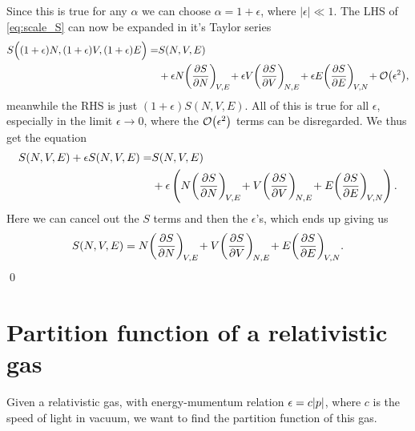 \documentclass[11pt,letter, swedish, english
]{article}
\begin{document}
Since this is true for any $\alpha$ we can choose $\alpha=1+\epsilon$,
where $|\epsilon|\ll1$\footnotemark{}. The LHS of \eqref{eq:scale_S}
can now be expanded in it's Taylor series
\begin{equation}
\begin{aligned}
S\Big((1+\epsilon) N, (1+\epsilon) V, (1+\epsilon) E\Big) =& 
S(N, V, E)\\
&+ \epsilon N\qty(\pdv{S}{N})_{\!V,E}\!
+ \epsilon V\qty(\pdv{S}{V})_{\!N,E}\!
+ \epsilon E\qty(\pdv{S}{E})_{\!V,N}\!
+ \order{\epsilon^2},
\end{aligned}
\end{equation}
meanwhile the RHS is just $(1+\epsilon)S(N, V, E)$.
All of this is true for all $\epsilon$, especially in the limit
$\epsilon\to0$, where the $\order{\epsilon^2}$ terms can be
disregarded. We thus get the equation
\begin{equation}
\begin{aligned}
S(N, V, E) + \epsilon S(N, V, E) =&
S(N, V, E)\\
&+\epsilon
\left(N\qty(\pdv{S}{N})_{\!V,E}\!
+ V\qty(\pdv{S}{V})_{\!N,E}\!
+ E\qty(\pdv{S}{E})_{\!V,N}\right).
\end{aligned}
\end{equation}
Here we can cancel out the $S$ terms and then the $\epsilon$'s, which
ends up giving us
\begin{equation}
S(N, V, E) =
N\qty(\pdv{S}{N})_{\!V,E}\!
+ V\qty(\pdv{S}{V})_{\!N,E}\!
+ E\qty(\pdv{S}{E})_{\!V,N}.
\end{equation}
\qed


\section{Partition function of a relativistic gas}
Given a relativistic gas, with energy-mumentum relation
$\epsilon=c\abs{p}$, where $c$ is the speed of light in vacuum, we
want to find the partition function of this gas. 
\end{document}
